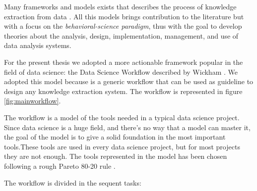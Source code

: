 \documentclass[]{book}
\theoremstyle{definition}
\theoremstyle{definition}
\theoremstyle{definition}
\theoremstyle{remark}
\begin{document}
Many frameworks and models exists that describes the process of
knowledge extraction from data \citep[\citet{bellinger2004data},
\citet{ackoff1989data},
\citet{liew2007understanding}]{kanehisa2013data}. All this models brings
contribution to the literature but with a focus on the
\emph{behavioral-science paradigm}, thus with the goal to develop
theories about the analysis, design, implementation, management, and use
of data analysis systems.

For the present thesis we adopted a more actionable framework popular in
the field of data science: the Data Science Workflow described by
Wickham \citep{wickham2016r}. We adopted this model because is a generic
workflow that can be used as guideline to design any knowledge
extraction system. The workflow is represented in figure
\ref{fig:mainworkflow}.

The workflow is a model of the tools needed in a typical data science
project. Since data science is a huge field, and there's no way that a
model can master it, the goal of the model is to give a solid foundation
in the most important tools.These tools are used in every data science
project, but for most projects they are not enough. The tools
represented in the model has been chosen following a rough Pareto 80-20
rule \citep{pareto1971manual}.

The workflow is divided in the sequent tasks:
\end{document}
